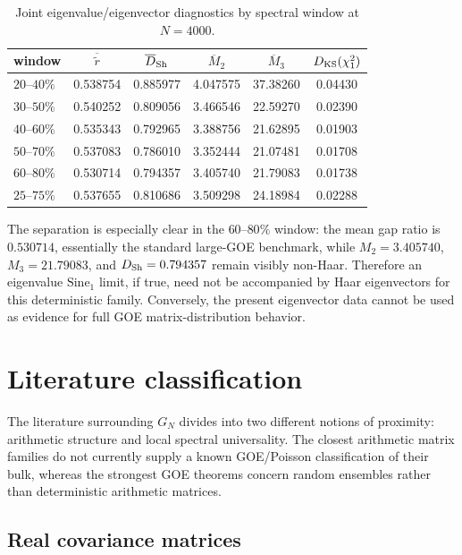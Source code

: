 \documentclass[11pt]{amsart}
\numberwithin{equation}{section}
\theoremstyle{plain}
\theoremstyle{definition}
\theoremstyle{remark}
\begin{document}
\begin{table}[htbp]
\centering
\caption{Joint eigenvalue/eigenvector diagnostics by spectral window at $N=4000$.}
\label{tab:window_joint_N4000}
\begin{tabular}{lccccc}
\toprule
window & $\overline{\widetilde r}$ & $\overline D_{\rm Sh}$ & $\overline M_2$ & $\overline M_3$ & $D_{\rm KS}(\chi_1^2)$\\
\midrule
$20$--$40\%$ & 0.538754 & 0.885977 & 4.047575 & 37.38260 & 0.04430\\
$30$--$50\%$ & 0.540252 & 0.809056 & 3.466546 & 22.59270 & 0.02390\\
$40$--$60\%$ & 0.535343 & 0.792965 & 3.388756 & 21.62895 & 0.01903\\
$50$--$70\%$ & 0.537083 & 0.786010 & 3.352444 & 21.07481 & 0.01708\\
$60$--$80\%$ & 0.530714 & 0.794357 & 3.405740 & 21.79083 & 0.01738\\
$25$--$75\%$ & 0.537655 & 0.810686 & 3.509298 & 24.18984 & 0.02288\\
\bottomrule
\end{tabular}
\end{table}

The separation is especially clear in the $60$--$80\%$ window: the mean gap ratio is $0.530714$, essentially the standard large-GOE benchmark, while $M_2=3.405740$, $M_3=21.79083$, and $D_{\rm Sh}=0.794357$ remain visibly non-Haar.  Therefore an eigenvalue $
\mathrm{Sine}_1$ limit, if true, need not be accompanied by Haar eigenvectors for this deterministic family.  Conversely, the present eigenvector data cannot be used as evidence for full GOE matrix-distribution behavior.

\section{Literature classification}
\label{sec:literature_classification}

The literature surrounding $G_N$ divides into two different notions of proximity: arithmetic structure and local spectral universality.  The closest arithmetic matrix families do not currently supply a known GOE/Poisson classification of their bulk, whereas the strongest GOE theorems concern random ensembles rather than deterministic arithmetic matrices.

\subsection{Real covariance matrices}
\label{subsec:covariance_literature}
\end{document}
